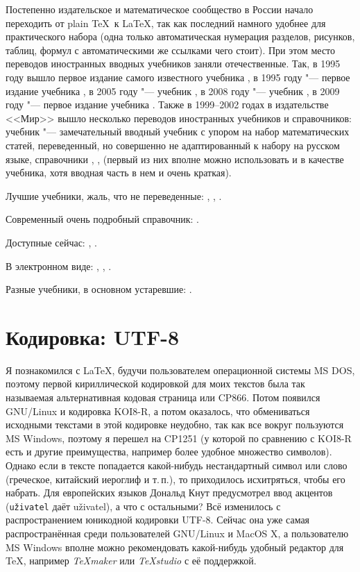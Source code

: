 \documentclass[a4paper,12pt,hyphens]{article}
\newcommand\softname[1]{\textit{#1}}
\newcommand\lcmd[1]{\texttt{#1}}
\begin{document}
Постепенно издательское и математическое сообщество в России начало переходить от plain \TeX\ к \LaTeX, так как последний
намного удобнее для практического набора (одна только автоматическая нумерация разделов, рисунков, таблиц, формул с автоматическими
же ссылками чего стоит). При этом место переводов иностранных вводных учебников заняли отечественные. Так, в 1995 году вышло первое издание самого известного учебника \parencite{lvovskiy:2014}, в 1995 году "--- первое издание учебника \parencite{kotelnikov-chebotaev:2016}, в 2005 году "--- учебник \parencite{rozhenko:2005}, в 2008 году "--- учебник \parencite{baldin:2008}, в 2009 году "--- первое издание учебника \parencite{belyakov-palosh-sadovskiy:2012}. Также в 1999--2002 годах в издательстве <<Мир>> вышло несколько переводов иностранных учебников и справочников: учебник \parencite{gratzer:2000} "--- замечательный вводный учебник с упором на набор математических статей, переведенный, но совершенно не адаптированный к набору на русском языке, справочники \parencite{gussens-mittelbach-samarin:1999}, \parencite{gussens-ratz:2001}, \parencite{gussens-ratz-mittelbach:2002} (первый из них вполне можно использовать и в качестве учебника, хотя вводная часть в нем и очень краткая).


Лучшие учебники, жаль, что не переведенные: 
\parencite{lamport:1994},
\parencite{kopka-daly:2004},
\parencite{gratzer:2016}.

Современный очень подробный справочник:
\parencite{mittelbach-fischer:2023}.

Доступные сейчас:
\parencite{kottwitz:2022},
\parencite{lvovskiy:2014}.

В электронном виде:
\parencite{vorontsov:2005},
\parencite{stolyarov:2010},
\parencite{kuznetsov:2021}.

Разные учебники, в основном устаревшие:
\parencite{morozov-parhomenko:2011}.

\section{Кодировка: UTF-8}
Я познакомился с \LaTeX, будучи пользователем операционной системы MS DOS,
поэтому первой кириллической кодировкой для моих текстов была так называемая
альтернативная кодовая страница или CP866. Потом появился GNU/Linux и кодировка
KOI8-R, а потом оказалось, что обмениваться исходными текстами в этой кодировке
неудобно, так как все вокруг пользуются MS Windows, поэтому я перешел на
CP1251 (у которой по сравнению с KOI8-R есть и другие преимущества, например
более удобное множество символов). Однако если в тексте попадается какой-нибудь
нестандартный символ или слово (греческое, китайский иероглиф и т.\,п.), то
приходилось исхитряться, чтобы его набрать. Для европейских языков Дональд Кнут
предусмотрел ввод акцентов (\lcmd{u\v{z}ivatel} даёт u\v{z}ivatel), а что с
остальными? Всё изменилось с распространением юникодной кодировки UTF-8. Сейчас
она уже самая распространённая среди пользователей GNU/Linux и MacOS X,
а пользователю MS Windows вполне можно рекомендовать какой-нибудь удобный
редактор для \TeX, например \softname{TeXmaker} \parencite{site-texmaker}
или \softname{TeXstudio} \parencite{site-texstudio} с её поддержкой.
\end{document}
